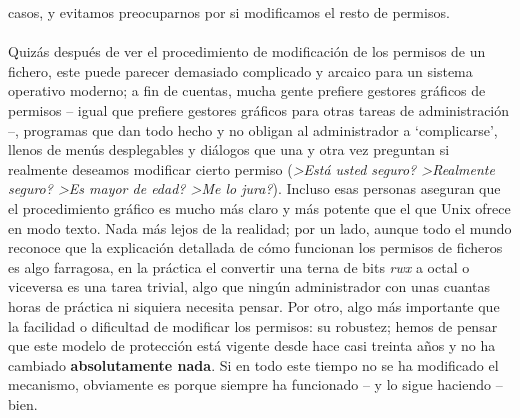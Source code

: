 casos, y evitamos preocuparnos por si modificamos el resto de permisos.\\
\\Quiz\'as despu\'es de ver el procedimiento de modificaci\'on de los permisos
de un fichero, este puede parecer demasiado
complicado y arcaico para un sistema operativo moderno; a fin de
cuentas, mucha gente prefiere gestores gr\'aficos de permisos -- igual que
prefiere gestores gr\'aficos para otras tareas de administraci\'on --, programas
que dan todo hecho y no obligan al administrador a `complicarse', llenos de
men\'us desplegables y di\'alogos que una y otra vez preguntan si realmente 
deseamos modificar cierto permiso ({\it >Est\'a usted seguro? >Realmente 
seguro? >Es mayor de edad? >Me lo jura?}). Incluso esas personas aseguran que
el procedimiento gr\'afico es mucho m\'as claro y m\'as potente que el que
Unix ofrece en modo texto. Nada m\'as lejos de la realidad; por un lado,
aunque todo el mundo reconoce que la explicaci\'on detallada de c\'omo funcionan
los permisos de ficheros es algo farragosa, en la pr\'actica el convertir una
terna de bits {\it rwx} a octal o viceversa es una tarea trivial, algo que 
ning\'un 
administrador con unas cuantas horas de pr\'actica ni siquiera necesita pensar. 
Por otro, algo m\'as importante que la facilidad o dificultad de
modificar los permisos: su robustez; hemos de pensar que este modelo de
protecci\'on est\'a vigente desde hace casi treinta a\~nos y no ha cambiado 
{\bf absolutamente nada}. Si en todo este tiempo no se ha modificado el 
mecanismo, obviamente es porque siempre ha funcionado -- y lo sigue haciendo --
bien.
